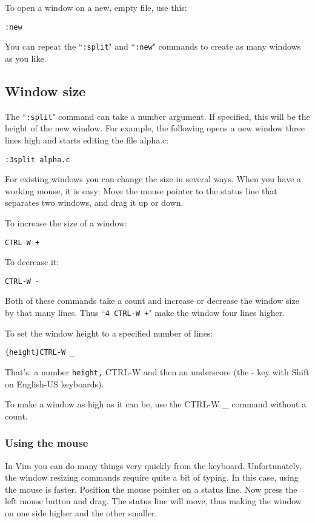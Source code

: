 To open a window on a new, empty file, use this:

 \begin{Verbatim}[samepage=true]
 :new
 \end{Verbatim}

You can repeat the ``\texttt{:split}" and ``\texttt{:new}" commands to create as many windows as you like.

\subsection{Window size}
The ``\texttt{:split}" command can take a number argument.
If specified, this will be the height of the new window.
For example, the following opens a new window three lines high and starts editing the file alpha.c:

 \begin{Verbatim}[samepage=true]
 :3split alpha.c
 \end{Verbatim}

For existing windows you can change the size in several ways.
When you have a working mouse, it is easy: Move the mouse pointer to the status line that separates two windows, and drag it up or down.

To increase the size of a window:

 \begin{Verbatim}[samepage=true]
 CTRL-W +
 \end{Verbatim}

To decrease it:

 \begin{Verbatim}[samepage=true]
 CTRL-W -
 \end{Verbatim}

Both of these commands take a count and increase or decrease the window size by that many lines.
Thus ``\texttt{4 CTRL-W +}" make the window four lines higher.

To set the window height to a specified number of lines:

 \begin{Verbatim}[samepage=true]
 {height}CTRL-W _
 \end{Verbatim}

That's: a number \texttt{{height},} CTRL-W and then an underscore (the - key with Shift on English-US keyboards).

To make a window as high as it can be, use the CTRL-W \_ command without a count.

\subsubsection{Using the mouse}
In Vim you can do many things very quickly from the keyboard.
Unfortunately, the window resizing commands require quite a bit of typing.
In this case, using the mouse is faster.
Position the mouse pointer on a status line.
Now press the left mouse button and drag.
The status line will move, thus making the window on one side higher and the other smaller.

